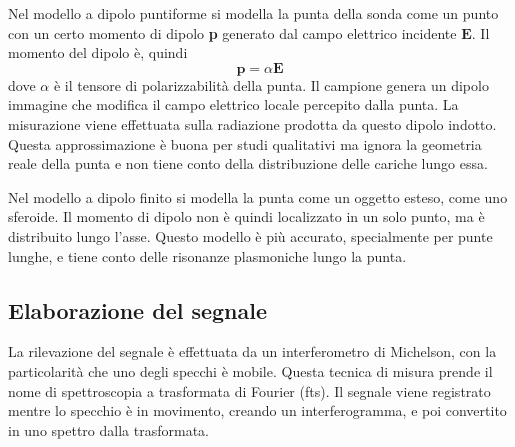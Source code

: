 \documentclass[../main.tex]{subfiles}
\begin{document}
Nel modello a dipolo puntiforme si modella la punta della sonda come un punto con un certo momento di dipolo \textbf{p} generato dal campo elettrico incidente $\mathbf{E}$. Il momento del dipolo è, quindi
\begin{equation}
	\mathbf{p}=\alpha\mathbf{E}
\end{equation}
dove $\alpha$ è il tensore di polarizzabilità della punta. Il campione genera un dipolo immagine che modifica il campo elettrico locale percepito dalla punta. La misurazione viene effettuata sulla radiazione prodotta da questo dipolo indotto. Questa approssimazione è buona per studi qualitativi ma ignora la geometria reale della punta e non tiene conto della distribuzione delle cariche lungo essa.\cite{wu_2005}

Nel modello a dipolo finito si modella la punta come un oggetto esteso, come uno sferoide. Il momento di dipolo non è quindi localizzato in un solo punto, ma è distribuito lungo l'asse. Questo modello è più accurato, specialmente per punte lunghe, e tiene conto delle risonanze plasmoniche lungo la punta.\cite{jarzembski_2017}

\subsection{Elaborazione del segnale}

La rilevazione del segnale è effettuata da un interferometro di Michelson, con la particolarità che uno degli specchi è mobile. Questa tecnica di misura prende il nome di spettroscopia a trasformata di Fourier (\acrshort{fts}). Il segnale viene registrato mentre lo specchio è in movimento, creando un interferogramma, e poi convertito in uno spettro dalla trasformata.
\end{document}
